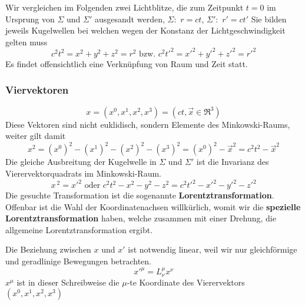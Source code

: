 Wir vergleichen im Folgenden zwei Lichtblitze, die zum Zeitpunkt $t=0$ im Ursprung von $\Sigma$ und $\Sigma'$ ausgesandt werden, $\Sigma:$ $r = ct$, $\Sigma':$ $r' = c t'$ Sie bilden jeweils Kugelwellen bei welchen wegen der Konstanz der Lichtgeschwindigkeit gelten muss 
$$c^2 t^2 = x^2 + y^2 + z^2 = r^2 \text{~bzw.~} c^2t'^2 = x'^2 + y'^2 + z'^2 = r'^2$$
Es findet offensichtlich eine Verknüpfung von Raum und Zeit statt.

\subsubsection{Viervektoren}
$$x = (x^0, x^1, x^2, x^3) = (ct, \vec{x}\in\Re^3)$$
Diese Vektoren sind nicht euklidisch, sondern Elemente des Minkowski-Raums, weiter gilt damit
$$x^2 = (x^0)^2 - (x^1)^2 - (x^2)^2 - (x^3)^2 = (x^0)^2 - \vec{x}^2 = c^2t^2 - \vec{x}^2$$
Die gleiche Ausbreitung der Kugelwelle in $\Sigma$ und $\Sigma'$ ist die Invarianz des Vierervektorquadrats im Minkowski-Raum.
$$x^{~2} = x'^2 \text{~oder~} c^2 t^2 - x^2 - y^2 - z^2 = c^2 t'^2 - x'^2 - y'^2 - z'^2$$
Die gesuchte Transformation ist die sogenannte \textbf{Lorentztransformation}. Offenbar ist die Wahl der Koordinatenachsen willkürlich, womit wir die \textbf{spezielle Lorentztransformation} haben, welche zusammen mit einer Drehung, die allgemeine Lorentztransformation ergibt.


Die Beziehung zwischen $x$ und $x'$ ist notwendig linear, weil wir nur gleichförmige und geradlinige Bewegungen betrachten.
$$x'^{\mu} = L^\mu_\nu x^\nu$$
$x^\mu$ ist in dieser Schreibweise die $\mu$-te Koordinate des Vierervektors $(x^0, x^1, x^2, x^3)$  

